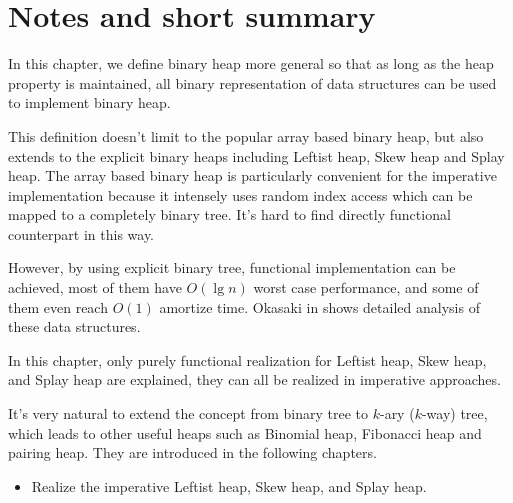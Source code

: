 \documentclass[b5paper]{article}
\begin{document}
\section{Notes and short summary}

In this chapter, we define binary heap more general
so that as long as the heap property is maintained, all binary
representation of data structures can be used to implement binary heap.

This definition doesn't limit to the popular array based binary
heap, but also extends to the explicit binary heaps including Leftist
heap, Skew heap and Splay heap. The array based binary heap
is particularly convenient for the imperative implementation
because it intensely uses random index access which can be mapped to
a completely binary tree. It's hard to find directly functional
counterpart in this way.

However, by using explicit binary tree, functional implementation
can be achieved, most of them have $O(\lg n)$ worst case
performance, and some of them even reach $O(1)$ amortize time.
Okasaki in \cite{okasaki-book} shows detailed analysis of these data
structures.

In this chapter, only purely functional realization for Leftist heap,
Skew heap, and Splay heap are explained, they can all be realized
in imperative approaches.

It's very natural to extend the concept from binary tree to
$k$-ary ($k$-way) tree, which leads to other useful heaps such as
Binomial heap, Fibonacci heap and pairing heap. They are introduced
in the following chapters.

\begin{Exercise}
\begin{itemize}
\item Realize the imperative Leftist heap, Skew heap, and Splay heap.
\end{itemize}
\end{Exercise}
\end{document}
